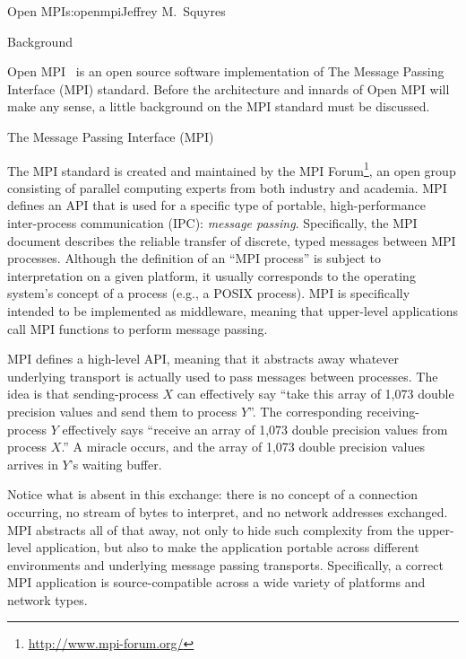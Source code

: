 \begin{aosachapter}{Open MPI}{s:openmpi}{Jeffrey M.\ Squyres}

\begin{aosasect1}{Background}

Open MPI~\cite{bib:open-mpi-general} is an open source software
implementation of The Message Passing Interface (MPI) standard.
Before the architecture and innards of Open MPI will make any sense,
a little background on the MPI standard must be discussed.


\begin{aosasect2}{The Message Passing Interface (MPI)}

The MPI standard is created and maintained by the MPI
Forum\footnote{\url{http://www.mpi-forum.org/}}, an open group
consisting of parallel computing experts from both industry and
academia.  MPI defines an API that is used for a specific type of
portable, high-performance inter-process communication (IPC):
\emph{message passing}.  Specifically, the MPI document describes the
reliable transfer of discrete, typed messages between MPI processes.
Although the definition of an ``MPI process'' is subject to
interpretation on a given platform, it usually corresponds to the
operating system's concept of a process (e.g., a POSIX process).  MPI
is specifically intended to be implemented as middleware, meaning that
upper-level applications call MPI functions to perform message
passing.

MPI defines a high-level API, meaning that it abstracts away whatever
underlying transport is actually used to pass messages between
processes.  The idea is that sending-process $X$ can effectively say
``take this array of 1,073 double precision values and send them to
process $Y$''.  The corresponding receiving-process $Y$ effectively
says ``receive an array of 1,073 double precision values from process
$X$.''  A miracle occurs, and the array of 1,073 double precision
values arrives in $Y$'s waiting buffer.

Notice what is absent in this exchange: there is no concept of a
connection occurring, no stream of bytes to interpret, and no network
addresses exchanged.  MPI abstracts all of that away, not only to hide
such complexity from the upper-level application, but also to make the
application portable across different environments and underlying
message passing transports.  Specifically, a correct MPI application
is source-compatible across a wide variety of platforms and network
types.


\end{aosasect2}
\end{aosasect1}
\end{aosachapter}

